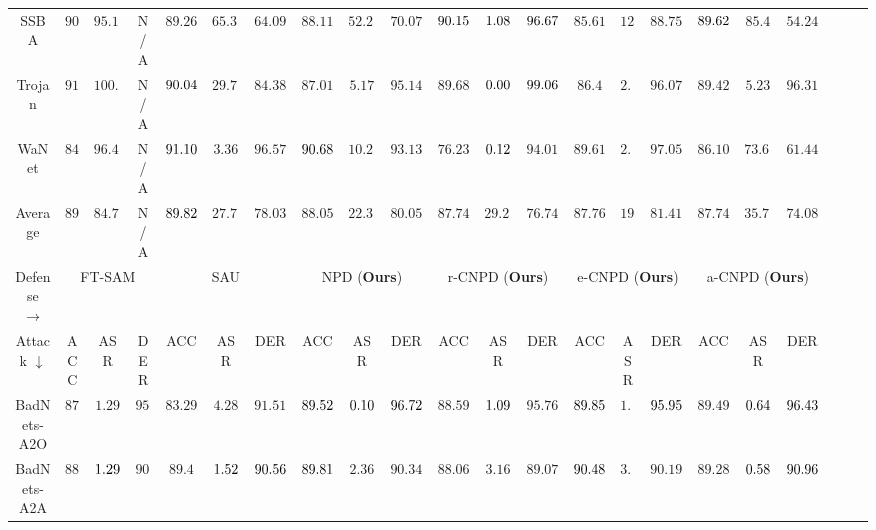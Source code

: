 \begin{table*}[h]
{\begin{tabular}{c|ccc|ccc|ccc|ccc|ccc|ccc|ccc}
SSBA \cite{li2021invisible} & $90.85$& $95.11$&  N/A & $89.26$& $65.33$& $64.09$& $88.11$& $52.22$& $70.07$& $\cellcolor[HTML]{FEEBB8}90.15$& $\cellcolor[HTML]{D7E8F2}1.08$& $\cellcolor[HTML]{FEEBB8}96.67$& $85.61$& $12.37$& $88.75$& $\cellcolor[HTML]{D7E8F2}89.62$& $85.4$& $54.24$\\
Trojan \cite{Trojannn} & $91.57$& $100.0$&  N/A & $\cellcolor[HTML]{D7E8F2}90.04$& $29.71$& $84.38$& $87.01$& $5.17$& $95.14$& $89.68$& $\cellcolor[HTML]{D7E8F2}0.00$& $\cellcolor[HTML]{D7E8F2}99.06$& $86.4$& $2.69$& $96.07$& $89.42$& $5.23$& $96.31$\\
WaNet \cite{nguyen2021wanet} & $84.58$& $96.49$&  N/A & $\cellcolor[HTML]{F1B9B6}91.10$& $3.36$& $96.57$& $\cellcolor[HTML]{D7E8F2}90.68$& $10.23$& $93.13$& $76.23$& $\cellcolor[HTML]{F1B9B6}0.12$& $94.01$& $89.61$& $2.4$& $97.05$& $86.10$& $73.61$& $61.44$\\ \midrule
Average & $89.05$& $84.79$&  N/A & $\cellcolor[HTML]{D7E8F2}89.82$& $27.71$& $78.03$& $88.05$& $22.39$& $80.05$& $87.74$& $29.28$& $76.74$& $87.76$& $19.36$& $81.41$& $87.74$& $35.72$& $74.08$\\
\toprule
\toprule
Defense $\rightarrow$ & \multicolumn{3}{c|}{FT-SAM \cite{zhu2023enhancing}} & \multicolumn{3}{c|}{SAU \cite{wei2023shared}} & \multicolumn{3}{c|}{NPD (\textbf{Ours})} & \multicolumn{3}{c|}{r-CNPD (\textbf{Ours})} & \multicolumn{3}{c|}{e-CNPD (\textbf{Ours})} & \multicolumn{3}{c}{a-CNPD (\textbf{Ours})} \\ 
Attack $\downarrow$ & \multicolumn{1}{c}{ACC} & \multicolumn{1}{c}{ASR} & \multicolumn{1}{c|}{DER} & \multicolumn{1}{c}{ACC} & \multicolumn{1}{c}{ASR} & \multicolumn{1}{c|}{DER} & \multicolumn{1}{c}{ACC} & \multicolumn{1}{c}{ASR} & \multicolumn{1}{c|}{DER} & \multicolumn{1}{c}{ACC} & \multicolumn{1}{c}{ASR} & \multicolumn{1}{c|}{DER} & \multicolumn{1}{c}{ACC} & \multicolumn{1}{c}{ASR} & \multicolumn{1}{c|}{DER} & \multicolumn{1}{c}{ACC} & \multicolumn{1}{c}{ASR} & \multicolumn{1}{c}{DER} \\ \midrule
BadNets-A2O \cite{gu2019badnets} & $87.63$& $1.29$& $95.18$& $83.29$& $4.28$& $91.51$& $\cellcolor[HTML]{D7E8F2}89.52$& $\cellcolor[HTML]{F1B9B6}0.10$& $\cellcolor[HTML]{F1B9B6}96.72$& $88.59$& $\cellcolor[HTML]{D7E8F2}1.09$& $95.76$& $\cellcolor[HTML]{FEEBB8}89.85$& $1.96$& $\cellcolor[HTML]{D7E8F2}95.95$& $89.49$& $\cellcolor[HTML]{FEEBB8}0.64$& $\cellcolor[HTML]{FEEBB8}96.43$\\
BadNets-A2A \cite{gu2019badnets} & $88.76$& $\cellcolor[HTML]{FEEBB8}1.29$& $90.35$& $89.4$& $\cellcolor[HTML]{D7E8F2}1.52$& $\cellcolor[HTML]{FEEBB8}90.56$& $\cellcolor[HTML]{D7E8F2}89.81$& $2.36$& $90.34$& $88.06$& $3.16$& $89.07$& $\cellcolor[HTML]{F1B9B6}90.48$& $3.33$& $90.19$& $89.28$& $\cellcolor[HTML]{F1B9B6}0.58$& $\cellcolor[HTML]{F1B9B6}90.96$\\

\end{tabular}}
\end{table*}

